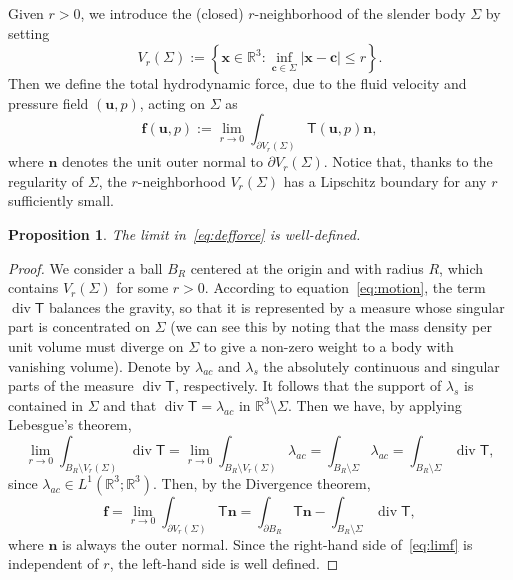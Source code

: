\documentclass[final]{amsart}
\newtheorem{prop}[thm]{Proposition}
\theoremstyle{definition}
\theoremstyle{definition}
\theoremstyle{remark}
\begin{document}
Given $r>0$, we introduce the (closed) $r$-neighborhood of the slender
body ${\Sigma}$ by setting
\[
V_r({\Sigma}):=\left\{{\boldsymbol x}\in{\mathbb R}^3 : \inf_{{\boldsymbol c}\in {\Sigma}}|{\boldsymbol x} - {\boldsymbol c}|\leq r \right\}.
\]
Then we define the total hydrodynamic force, due to the fluid velocity
and pressure field $({\boldsymbol u},p)$, acting on ${\Sigma}$ as
\begin{equation}\label{eq:defforce}
{\boldsymbol f}({\boldsymbol u},p):=\lim_{r\to 0}\int_{{\partial} V_r({\Sigma})}{\mathsf T}({\boldsymbol u},p){\boldsymbol n},
\end{equation}
where ${\boldsymbol n}$ denotes the unit outer normal to ${\partial} V_r({\Sigma})$. Notice
that, thanks to the regularity of ${\Sigma}$, the $r$-neighborhood
$V_r({\Sigma})$ has a Lipschitz boundary for any $r$ sufficiently small.
\begin{prop}
The limit in~\eqref{eq:defforce} is well-defined.
\end{prop}
\begin{proof}
  We consider a ball $B_R$ centered at the origin and with radius $R$,
  which contains $V_r({\Sigma})$ for some $r>0$. According to
  equation~\eqref{eq:motion}, the term ${\operatorname{\mathrm{div}}}{\mathsf T}$ balances the
  gravity, so that it is represented by a measure whose singular part
  is concentrated on ${\Sigma}$ (we can see this by noting that the mass
  density per unit volume must diverge on ${\Sigma}$ to give a non-zero
  weight to a body with vanishing volume). Denote by $\lambda_{ac}$ and
  $\lambda_s$ the absolutely continuous and singular parts of the
  measure ${\operatorname{\mathrm{div}}}{\mathsf T}$, respectively. It follows that the support of
  $\lambda_s$ is contained in ${\Sigma}$ and that ${\operatorname{\mathrm{div}}}{\mathsf T}=\lambda_{ac}$ in
  ${\mathbb R}^3\setminus{\Sigma}$. Then we have, by applying
  Lebesgue's theorem,
\begin{equation}\label{eq:compl}
\lim_{r\to 0}\int_{B_R\setminus V_r({\Sigma})}{\operatorname{\mathrm{div}}}{\mathsf T}=\lim_{r\to 0}\int_{B_R\setminus V_r({\Sigma})}\lambda_{ac}=\int_{B_R\setminus{\Sigma}}\lambda_{ac}=\int_{B_R\setminus{\Sigma}}{\operatorname{\mathrm{div}}}{\mathsf T},
\end{equation}
since $\lambda_{ac}\in L^1({\mathbb R}^3;{\mathbb R}^3)$. Then, by the Divergence theorem,
\begin{equation}\label{eq:limf}
{\boldsymbol f}=\lim_{r\to 0}\int_{{\partial} V_r({\Sigma})}{\mathsf T}{\boldsymbol n}=\int_{{\partial} B_R}{\mathsf T}{\boldsymbol n}-\int_{B_R\setminus{\Sigma}}{\operatorname{\mathrm{div}}}{\mathsf T},
\end{equation}
where ${\boldsymbol n}$ is always the outer normal. Since the right-hand side
of~\eqref{eq:limf} is independent of $r$, the left-hand side is well
defined. 
\end{proof}
\end{document}
